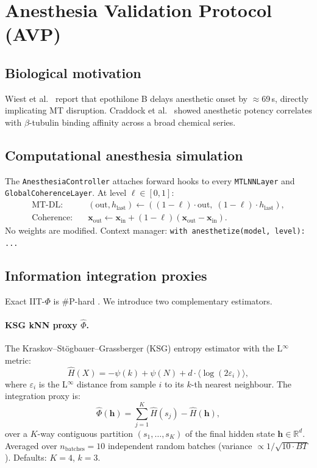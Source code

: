 \documentclass[11pt]{article}
\theoremstyle{definition}
\newcommand{\RR}{\mathbb{R}}
\newcommand{\vh}{\mathbf{h}}
\newcommand{\vx}{\mathbf{x}}
\newcommand{\phihat}{\hat{\Phi}}
\begin{document}
\section{Anesthesia Validation Protocol (AVP)}
\label{sec:avp}

\subsection{Biological motivation}
Wiest et al.\ \citep{wiest2025quantum} report that epothilone B delays anesthetic onset by $\approx$69\,s, directly implicating MT disruption. Craddock et al.\ \citep{craddock2017anesthetic} showed anesthetic potency correlates with $\beta$-tubulin binding affinity across a broad chemical series.

\subsection{Computational anesthesia simulation}
The \texttt{AnesthesiaController} attaches forward hooks to every \texttt{MTLNNLayer} and \texttt{GlobalCoherenceLayer}. At level $\ell\in[0,1]$:
\begin{align}
  \text{MT-DL:}& \quad (\text{out}, h_\text{last}) \leftarrow ((1-\ell)\cdot\text{out},\;(1-\ell)\cdot h_\text{last}), \\
  \text{Coherence:}& \quad \vx_\text{out} \leftarrow \vx_\text{in} + (1-\ell)(\vx_\text{out}-\vx_\text{in}).
\end{align}
No weights are modified. Context manager: \texttt{with anesthetize(model, level): ...}

\subsection{Information integration proxies}
\label{sec:proxies}
Exact IIT-$\Phi$ is \#P-hard \citep{aaronson2014why}. We introduce two complementary estimators.

\paragraph{KSG kNN proxy $\phihat$.}
The Kraskov--St\"ogbauer--Grassberger (KSG) entropy estimator \citep{kraskov2004estimating} with the L$^\infty$ metric:
\begin{equation}
  \hat{H}(X) = -\psi(k) + \psi(N) + d\cdot\langle\log(2\varepsilon_i)\rangle,
\end{equation}
where $\varepsilon_i$ is the L$^\infty$ distance from sample $i$ to its $k$-th nearest neighbour. The integration proxy is:
\begin{equation}
  \phihat(\vh) = \sum_{j=1}^{K}\hat{H}(s_j) - \hat{H}(\vh),
  \label{eq:phi_hat}
\end{equation}
over a $K$-way contiguous partition $(s_1,\ldots,s_K)$ of the final hidden state $\vh\in\RR^d$. Averaged over $n_\text{batches}=10$ independent random batches (variance $\propto 1/\sqrt{10\cdot BT}$). Defaults: $K=4$, $k=3$.
\end{document}
